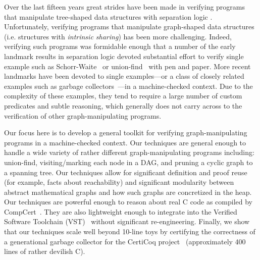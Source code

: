 Over the last fifteen years great strides have been made in verifying programs that manipulate
tree-shaped data structures with separation logic
\cite{berdine:smallfoot,chin:hipsleek,jacobs:verifast,chlipala:bedrock,bengtson:charge,appel:programlogics}.  Unfortunately, verifying programs that manipulate graph-shaped data structures (i.e. structures with \emph{intrinsic sharing}) has been more challenging.  Indeed, verifying such programs was formidable enough that a number of the early landmark results in separation logic devoted substantial effort to verify single example such as Schorr-Waite~\cite{hongseok:phd} or union-find~\cite{NeelThesis} with pen and paper.  More recent landmarks have been devoted to single examples---or a class of closely related examples such as garbage collectors~\cite{A,CakeMLGC,C}---in a machine-checked context.
Due to the complexity of these examples, they tend to require a large number of custom predicates and subtle reasoning, which generally does not carry across to the verification of other graph-manipulating programs.

Our focus here is to develop a general toolkit for verifying graph-manipulating programs in a machine-checked context.  Our techniques are general enough to handle a wide variety of rather different graph-manipulating programs including: union-find, visiting/marking each node in a DAG, and pruning a cyclic graph to a spanning tree.  Our techniques allow for significant definition and proof reuse (for example, facts about reachability) and significant modularity between abstract mathematical graphs and how such graphs are concretized in the heap.
Our techniques are powerful enough to reason about real C code as compiled by CompCert~\cite{blah}.  They are also lightweight enough to integrate into the Verified Software Toolchain (VST)~\cite{appel:programlogics} without significant re-engineering.
Finally, we show that our techniques scale well beyond 10-line toys by certifying the correctness of a generational garbage collector for the CertiCoq project~\cite{blah} (approximately 400 lines of rather devilish C).

